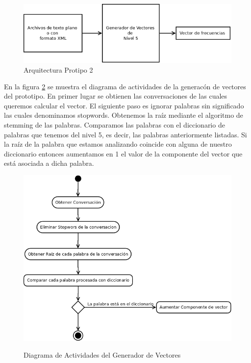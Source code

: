 \begin{center}
	\begin{figure}[h]
		\includegraphics[scale=.5]{images/diagramavectores}
		\caption{Arquitectura Protipo 2}
		\label{fig:arquitectura_vector}
	\end{figure}
\end{center}


En la figura \ref{fig:diagramaActividades} se muestra el diagrama de actividades de la generac\'on de vectores del prototipo. En primer lugar se obtienen las conversaciones de las cuales queremos calcular el vector. El siguiente paso es ignorar palabras sin significado las cuales denominamos stopwords. Obtenemos la ra\'iz mediante el algoritmo de stemming de las palabras. Comparamos las palabras con el diccionario de palabras que tenemos del nivel 5, es decir, las palabras anteriormente listadas. Si la ra\'iz de la palabra que estamos analizando coincide con alguna de nuestro diccionario entonces aumentamos en 1 el valor de la componente del vector que est\'a asociada a dicha palabra.

	\begin{figure}[h]
	\begin{center}
		\includegraphics[scale=.35]{images/actividades_vectores}
		\label{fig:diagramaActividades}
		\caption{Diagrama de Actividades del Generador de Vectores}
		\end{center}
	\end{figure}


